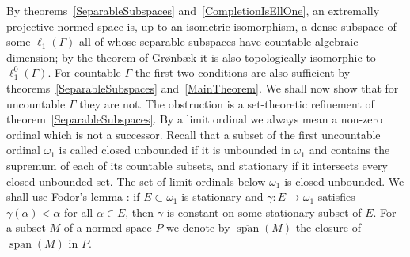 \documentclass[12pt]{article}
\newcommand{\lo}[1]{\ell_1^0(#1)}
\newcommand{\ellone}[1]{\ell_1(#1)}
\newcommand{\Lin}{\operatorname{span}}
\begin{document}
By theorems~\ref{SeparableSubspaces} and~\ref{CompletionIsEllOne}, an
extremally projective normed space is, up to an isometric isomorphism, a
dense subspace of some $\ellone{\Gamma}$ all of whose separable subspaces have
countable algebraic dimension; by the theorem of Gr{\o}nb{\ae}k it is also
topologically isomorphic to $\lo{\Gamma}$. For countable $\Gamma$ the first
two conditions are also sufficient by theorems~\ref{SeparableSubspaces}
and~\ref{MainTheorem}. We shall now show that for uncountable $\Gamma$ they
are not. The obstruction is a
set-theoretic refinement of theorem~\ref{SeparableSubspaces}. By a limit
ordinal we always mean a non-zero ordinal which is not a successor. Recall
that a subset of the first uncountable ordinal $\omega_1$ is called closed unbounded
if it is unbounded in $\omega_1$ and contains the supremum of each of its
countable subsets, and stationary if it intersects every closed unbounded
set. The set of limit ordinals below $\omega_1$ is closed unbounded. We shall
use Fodor's lemma \cite[theorem 8.7]{JechSetTheory}: if $E\subset\omega_1$ is
stationary and $\gamma:E\to\omega_1$ satisfies $\gamma(\alpha)<\alpha$ for all
$\alpha\in E$, then $\gamma$ is constant on some stationary subset of $E$.
For a subset $M$ of a normed space $P$ we denote by $\overline{\Lin}(M)$ the
closure of $\Lin(M)$ in $P$.
\end{document}
